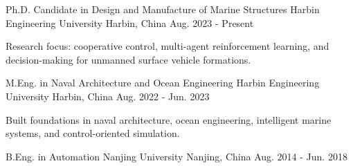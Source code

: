 

\begin{cventries}

  \cventry
    {Ph.D. Candidate in Design and Manufacture of Marine Structures}
    {Harbin Engineering University}
    {Harbin, China}
    {Aug. 2023 - Present}
    {
      \begin{cvitems}
        \item {Research focus: cooperative control, multi-agent reinforcement learning, and decision-making for unmanned surface vehicle formations.}
      \end{cvitems}
    }

  \cventry
    {M.Eng. in Naval Architecture and Ocean Engineering}
    {Harbin Engineering University}
    {Harbin, China}
    {Aug. 2022 - Jun. 2023}
    {
      \begin{cvitems}
        \item {Built foundations in naval architecture, ocean engineering, intelligent marine systems, and control-oriented simulation.}
      \end{cvitems}
    }

  \cventry
    {B.Eng. in Automation}
    {Nanjing University}
    {Nanjing, China}
    {Aug. 2014 - Jun. 2018}
    {}

\end{cventries}
